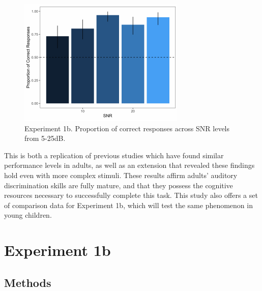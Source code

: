 \documentclass[10pt, letterpaper]{article}
\newenvironment{CodeChunk}{}{}
\begin{document}
\begin{CodeChunk}
\begin{figure}[H]

{\centering \includegraphics{figs/image 2-1} 

}

\caption[Experiment 1b]{Experiment 1b. Proportion of correct responses across SNR levels from 5-25dB.}\label{fig:image 2}
\end{figure}
\end{CodeChunk}

This is both a replication of previous studies which have found similar
performance levels in adults, as well as an extension that revealed
these findings hold even with more complex stimuli. These results affirm
adults' auditory discrimination skills are fully mature, and that they
possess the cognitive resources necessary to successfully complete this
task. This study also offers a set of comparison data for Experiment 1b,
which will test the same phenomenon in young children.

\hypertarget{experiment-1b}{%
\section{\texorpdfstring{\textbf{Experiment
1b}}{Experiment 1b}}\label{experiment-1b}}

\hypertarget{methods-1}{%
\subsection{\texorpdfstring{\textbf{Methods}}{Methods}}\label{methods-1}}
\end{document}
